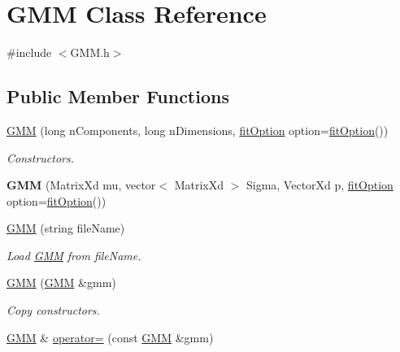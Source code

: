 \hypertarget{class_g_m_m}{\section{G\+M\+M Class Reference}
\label{class_g_m_m}
}


{\ttfamily \#include $<$G\+M\+M.\+h$>$}

\subsection*{Public Member Functions}
\begin{DoxyCompactItemize}
\item 
\hypertarget{class_g_m_m_a780eb798b963d64324e60f8a05511793}{\hyperlink{class_g_m_m_a780eb798b963d64324e60f8a05511793}{G\+M\+M} (long n\+Components, long n\+Dimensions, \hyperlink{structfit_option}{fit\+Option} option=\hyperlink{structfit_option}{fit\+Option}())}\label{class_g_m_m_a780eb798b963d64324e60f8a05511793}

\begin{DoxyCompactList}\small\item\em Constructors. \end{DoxyCompactList}\item 
\hypertarget{class_g_m_m_a204c0939ce8e0544a70f6bacac70430e}{{\bfseries G\+M\+M} (Matrix\+Xd mu, vector$<$ Matrix\+Xd $>$ Sigma, Vector\+Xd p, \hyperlink{structfit_option}{fit\+Option} option=\hyperlink{structfit_option}{fit\+Option}())}\label{class_g_m_m_a204c0939ce8e0544a70f6bacac70430e}

\item 
\hypertarget{class_g_m_m_a3fd2ad1e4b02532fbcc8c268f60b4ee8}{\hyperlink{class_g_m_m_a3fd2ad1e4b02532fbcc8c268f60b4ee8}{G\+M\+M} (string file\+Name)}\label{class_g_m_m_a3fd2ad1e4b02532fbcc8c268f60b4ee8}

\begin{DoxyCompactList}\small\item\em Load \hyperlink{class_g_m_m}{G\+M\+M} from file\+Name. \end{DoxyCompactList}\item 
\hypertarget{class_g_m_m_ae4a3fdfee01a1f37a58d405b701f1469}{\hyperlink{class_g_m_m_ae4a3fdfee01a1f37a58d405b701f1469}{G\+M\+M} (\hyperlink{class_g_m_m}{G\+M\+M} \&gmm)}\label{class_g_m_m_ae4a3fdfee01a1f37a58d405b701f1469}

\begin{DoxyCompactList}\small\item\em Copy constructors. \end{DoxyCompactList}\item 
\hypertarget{class_g_m_m_a60cc7218be23fa401a804b5d419632b9}{\hyperlink{class_g_m_m}{G\+M\+M} \& \hyperlink{class_g_m_m_a60cc7218be23fa401a804b5d419632b9}{operator=} (const \hyperlink{class_g_m_m}{G\+M\+M} \&gmm)}\label{class_g_m_m_a60cc7218be23fa401a804b5d419632b9}


\end{DoxyCompactItemize}
